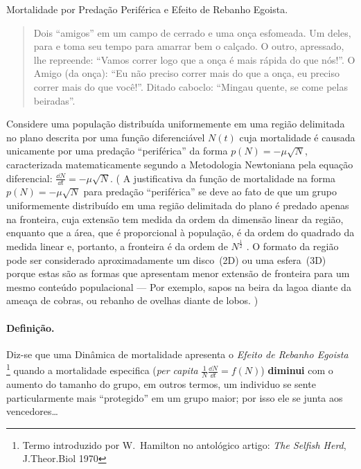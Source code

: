 \question
Mortalidade por Predação Periférica e Efeito de Rebanho Egoista.
 
\begin{quote}
Dois ``amigos'' em um campo de cerrado e uma onça esfomeada. 
Um deles, para e toma seu tempo para amarrar bem o calçado. 
O outro, apressado, lhe repreende: ``Vamos correr logo que a onça é mais rápida 
do que nós!''. 
O Amigo (da onça): ``Eu não preciso correr mais do que a onça, eu preciso correr 
mais do que você!''.
Ditado caboclo: ``Mingau quente, se come pelas beiradas''.
\end{quote}

Considere uma população distribuída uniformemente em uma região delimitada no
plano descrita por uma função diferenciável $ N(t) $ cuja mortalidade é causada 
unicamente por uma predação ``periférica'' da forma $ p(N) = -\mu \sqrt{N} $, 
caracterizada matematicamente segundo a Metodologia Newtoniana pela equação 
diferencial: $ \frac{\dd N}{\dd t} = -\mu\sqrt{N}$. 
(
  A justificativa da função de mortalidade na forma $ p(N) = -\mu \sqrt{N} $ 
  para predação ``periférica'' se deve ao fato de que um grupo uniformemente 
  distribuído em uma região delimitada do plano é predado apenas na fronteira, 
  cuja extensão tem medida da ordem da dimensão linear da região, enquanto que a 
  área, que é proporcional à população, é da ordem do quadrado da medida linear 
  e, portanto, a fronteira é da ordem de $ N^{\frac{1}{2}} $ . 
  O formato da região pode ser considerado aproximadamente um disco~(2D) ou uma 
  esfera~(3D) porque estas são as formas que apresentam menor extensão de 
  fronteira para um mesmo conteúdo populacional --- Por exemplo, sapos na beira 
  da lagoa diante da ameaça de cobras, ou rebanho de ovelhas diante de lobos.
)

\paragraph{Definição.}
 Diz-se que uma Dinâmica de mortalidade apresenta o 
 \textit{Efeito de Rebanho Egoista}
 \footnote
 {
  Termo introduzido por W.~Hamilton no antológico artigo: 
  \textit{The Selfish Herd}, J.Theor.Biol 1970
 }
 quando a mortalidade especifica (\textit{per capita} 
 $ \frac{1}{N}\frac{\dd{N}}{\dd t} = f(N) $) \textbf{diminui} com o aumento do 
 tamanho do grupo, em outros termos, um individuo se sente particularmente mais
 ``protegido'' em um grupo maior; por isso ele se junta aos vencedores\ldots
 
